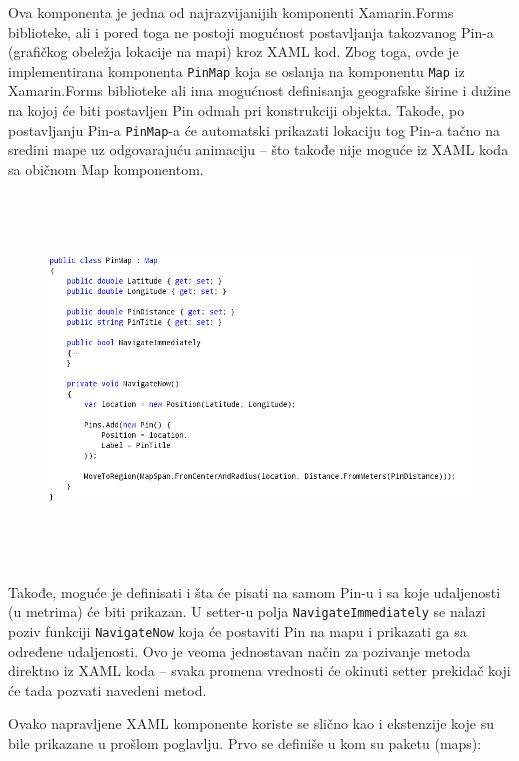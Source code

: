 \documentclass[a4paper]{article}
\begin{document}
Ova komponenta je jedna od najrazvijanijih komponenti Xamarin.Forms
biblioteke, ali i pored toga ne postoji mogućnost postavljanja
takozvanog Pin-a (grafičkog obeležja lokacije na mapi) kroz XAML kod.
Zbog toga, ovde je implementirana komponenta
\texttt{\textcolor[rgb]{0.0,0.4,0.8}{PinMap}} koja se oslanja na
komponentu \texttt{\textcolor[rgb]{0.0,0.4,0.8}{Map}} iz Xamarin.Forms
biblioteke ali ima mogućnost definisanja geografske širine i dužine na
kojoj će biti postavljen Pin odmah pri konstrukciji objekta. Takođe, po
postavljanju Pin-a \texttt{\textcolor[rgb]{0.0,0.4,0.8}{PinMap}}{}-a će
automatski prikazati lokaciju tog Pin-a tačno na sredini mape uz
odgovarajuću animaciju – što takođe nije moguće iz XAML koda sa običnom
Map komponentom.

\begin{figure}
\centering
\includegraphics[width=170mm,height=98.09mm]{msc-img57.png}
\end{figure}
Takođe, moguće je definisati i šta će pisati na samom Pin-u i sa koje
udaljenosti (u metrima) će biti prikazan. U setter-u polja
\texttt{\textcolor[rgb]{0.0,0.4,0.8}{NavigateImmediately}} se nalazi
poziv funkciji \texttt{\textcolor[rgb]{0.0,0.4,0.8}{NavigateNow}} koja
će postaviti Pin na mapu i prikazati ga sa određene udaljenosti. Ovo je
veoma jednostavan način za pozivanje metoda direktno iz XAML koda –
svaka promena vrednosti će okinuti setter prekidač koji će tada pozvati
navedeni metod.

Ovako napravljene XAML komponente koriste se slično kao i ekstenzije
koje su bile prikazane u prošlom poglavlju. Prvo se definiše u kom su
paketu (maps):
\end{document}
